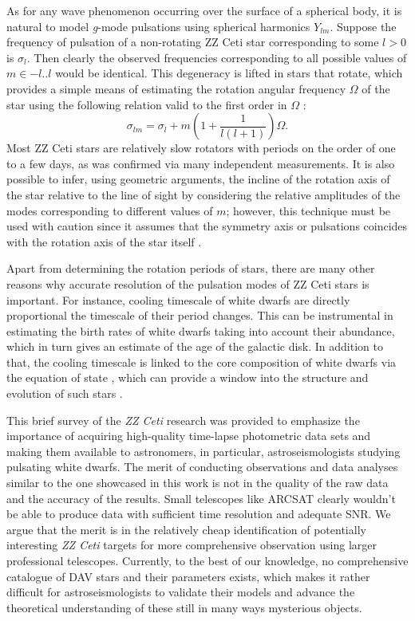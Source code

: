 \documentclass{aastex631}
\begin{document}
As for any wave phenomenon occurring over the surface of a spherical
body, it is natural to model \emph{g}-mode pulsations using spherical
harmonics $Y_{lm}$. Suppose the frequency of pulsation of a
non-rotating ZZ Ceti star corresponding to some $l>0$ is
$\sigma_l$. Then clearly the observed frequencies corresponding to all
possible values of $m\in-l..l$ would be identical. This degeneracy is
lifted in stars that rotate, which provides a simple means of
estimating the rotation angular frequency $\Omega$ of the star using
the following relation valid to the first order in $\Omega$
\citep{Fu_2013}:
\[
\sigma_{lm} = \sigma_l + m\left(1 + \frac{1}{l(l+1)}\right)\Omega.
\]
Most ZZ Ceti stars are relatively slow rotators with periods on the
order of one to a few days, as was confirmed via many independent
measurements. It is also possible to infer, using geometric arguments,
the incline of the rotation axis of the star relative to the line of
sight by considering the relative amplitudes of the modes
corresponding to different values of $m$; however, this technique must
be used with caution since it assumes that the symmetry axis or
pulsations coincides with the rotation axis of the star itself
\citep{Fu_2013}.

Apart from determining the rotation periods of stars, there are many
other reasons why accurate resolution of the pulsation modes of ZZ
Ceti stars is important. For instance, cooling timescale of white
dwarfs are directly proportional the timescale of their period
changes. This can be instrumental in estimating the birth rates of
white dwarfs taking into account their abundance, which in turn gives
an estimate of the age of the galactic disk. In addition to that, the
cooling timescale is linked to the core composition of white dwarfs
via the equation of state \citep{Koester_1990}, which can provide a
window into the structure and evolution of such stars
\citep{Kepler_1989}.

This brief survey of the \emph{ZZ Ceti} research was provided to
emphasize the importance of acquiring high-quality time-lapse
photometric data sets and making them available to astronomers, in
particular, astroseismologists studying pulsating white dwarfs. The
merit of conducting observations and data analyses similar to the one
showcased in this work is not in the quality of the raw data and the
accuracy of the results. Small telescopes like ARCSAT clearly wouldn't
be able to produce data with sufficient time resolution and adequate
SNR. We argue that the merit is in the relatively cheap identification
of potentially interesting \emph{ZZ Ceti} targets for more
comprehensive observation using larger professional
telescopes. Currently, to the best of our knowledge, no comprehensive
catalogue of DAV stars and their parameters exists, which makes it
rather difficult for astroseismologists to validate their models and
advance the theoretical understanding of these still in many ways
mysterious objects.
\end{document}
